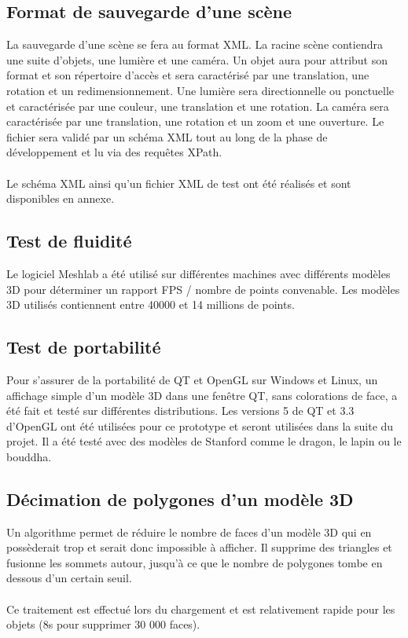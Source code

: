 \subsection{Format de sauvegarde d'une scène}

La sauvegarde d’une scène se fera au format XML. La racine scène contiendra une suite d’objets, une lumière et une caméra. Un objet aura pour attribut son format et son répertoire d’accès et sera caractérisé par une translation, une rotation et un redimensionnement. Une lumière sera directionnelle ou ponctuelle et caractérisée par une couleur, une translation et une rotation. La caméra sera caractérisée par une translation, une rotation et un zoom et une ouverture. Le fichier sera validé par un schéma XML tout au long de la phase de développement et lu via des requêtes XPath.

\paragraph{}
Le schéma XML ainsi qu’un fichier XML de test ont été réalisés et sont disponibles en annexe.

\subsection{Test de fluidité}

Le logiciel Meshlab a été utilisé sur différentes machines avec différents modèles 3D pour déterminer un rapport FPS / nombre de points convenable. Les modèles 3D utilisés contiennent entre 40000 et 14 millions de points.

\subsection{Test de portabilité}

Pour s’assurer de la portabilité de QT et OpenGL sur Windows et Linux, un affichage simple d’un modèle 3D dans une fenêtre QT, sans colorations de face, a été fait et testé sur différentes distributions. Les versions 5 de QT et 3.3 d’OpenGL ont été utilisées pour ce prototype et seront utilisées dans la suite du projet. Il a été testé avec des modèles de Stanford comme le dragon, le lapin ou le bouddha.

\subsection{Décimation de polygones d’un modèle 3D}

Un algorithme permet de réduire le nombre de faces d’un modèle 3D qui en possèderait trop et serait donc impossible à afficher. Il supprime des triangles et fusionne les sommets autour, jusqu’à ce que le nombre de polygones tombe en dessous d’un certain seuil.

\paragraph{}
Ce traitement est effectué lors du chargement et est relativement rapide pour les objets (8s pour supprimer 30 000 faces).
